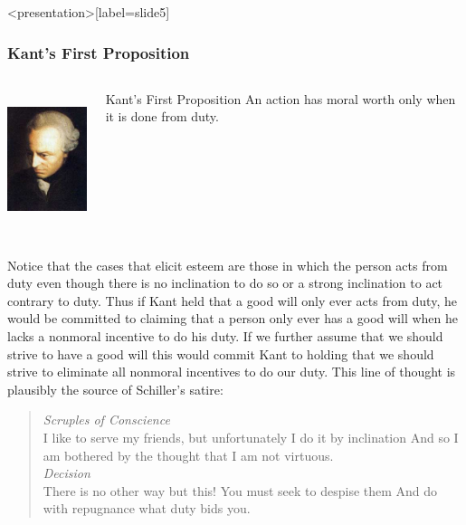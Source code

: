 \begin{frame}<presentation>[label=slide5]
    \frametitle{Kant's First Proposition}
        \begin{columns}
            \begin{column}{3cm}
                \includegraphics[height=4cm]{../../graphics/kant.jpg}
            \end{column}
            \begin{column}{7cm}
                \begin{block}{Kant's First Proposition}
                    An action has moral worth only when it is done from duty.
                \end{block}
            \end{column}
        \end{columns}
\end{frame}

Notice that the cases that elicit esteem are those in which the person acts from duty even though there is no inclination to do so or a strong inclination to act contrary to duty. Thus if Kant held that a good will only ever acts from duty, he would be committed to claiming that a person only ever has a good will when he lacks a nonmoral incentive to do his duty. If we further assume that we should strive to have a good will this would commit Kant to holding that we should strive to eliminate all nonmoral incentives to do our duty. This line of thought is plausibly the source of Schiller's satire:

\begin{quote}
    \emph{Scruples of Conscience}\\
	I like to serve my friends, but unfortunately I do it by inclination And so I am bothered by the thought that I am not virtuous.\\
	\emph{Decision}\\
	There is no other way but this! You must seek to despise them And do with repugnance what duty bids you.
\end{quote}

